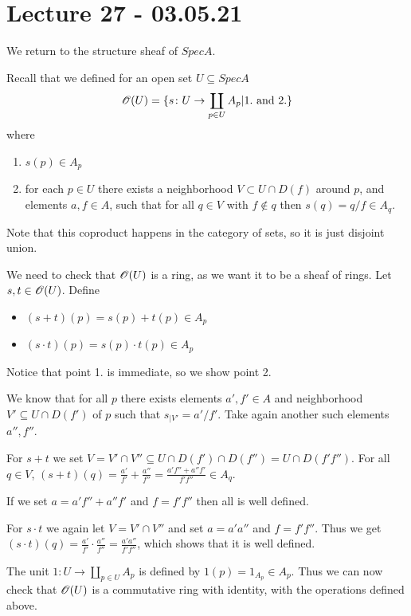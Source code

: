 



\section{Lecture 27 - 03.05.21}

We return to the structure sheaf of $Spec A$. 

Recall that we defined for an open set $U\subseteq Spec A$
\begin{equation*}
    \mathscr{O}(U) = \{s\colon U\to \coprod_{p\in U}A_p | 1. \text{ and } 2.\}
\end{equation*}
where 
\begin{enumerate}
    \item $s(p)\in A_p$
    \item for each $p\in U$ there exists a neighborhood $V\subset U\cap D(f)$ around $p$, and elements $a,f\in A$, such that for all $q\in V$ with $f\notin q$ then $s(q)=q/f \in A_q$. 
\end{enumerate}
Note that this coproduct happens in the category of sets, so it is just disjoint union. 


We need to check that $\mathscr{O}(U)$ is a ring, as we want it to be a sheaf of rings. Let $s,t\in \mathscr{O}(U)$. Define 
\begin{itemize}
    \item $(s+t)(p) = s(p)+t(p) \in A_p$
    \item $(s\cdot t)(p) = s(p)\cdot t(p)\in A_p$
\end{itemize}

Notice that point 1. is immediate, so we show point 2.

We know that for all $p$ there exists elements $a', f' \in A$ and neighborhood $V'\subseteq U\cap D(f')$ of $p$ such that $s_{|V'} = a'/f'$. Take again another such elements $a'', f''$. 

For $s+t$ we set $V=V'\cap V''\subseteq U\cap D(f')\cap D(f'') = U\cap D(f'f'')$. For all $q\in V$, $(s+t)(q) = \frac{a'}{f'} + \frac{a''}{f''} = \frac{a'f''+a''f'}{f'f''} \in A_q$. 

If we set $a = a'f''+a''f'$ and $f = f'f''$ then all is well defined. 

For $s\cdot t$ we again let $V = V'\cap V''$ and set $a = a'a''$ and $f = f'f''$. Thus we get $(s\cdot t)(q) = \frac{a'}{f'}\cdot \frac{a''}{f''} = \frac{a'a''}{f'f''}$, which shows that it is well defined. 

The unit $1\colon U\longrightarrow \coprod_{p\in U}A_p$ is defined by $1(p) = 1_{A_p}\in A_p$. Thus we can now check that $\mathscr{O}(U)$ is a commutative ring with identity, with the operations defined above. 


